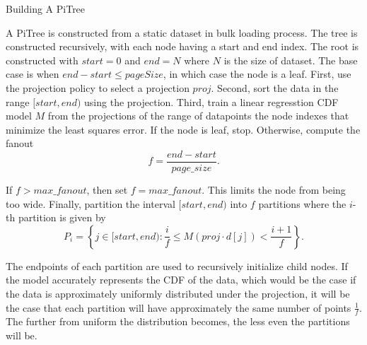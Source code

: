 \documentclass[sigconf,10pt]{acmart}
\begin{document}
\begin{algorithm}
  \caption{Building A PiTree}
\end{algorithm}

A PiTree is constructed from a static dataset in bulk loading process.
The tree is constructed recursively, with each node having a start and 
end index. The root is constructed with $start=0$ and $end=N$ where $N$
is the size of dataset. The base case is when $end - start \leq pageSize$,
in which case the node is a leaf.
First, use the projection policy to select a projection $proj$.
Second, sort the data in the range $[start, end)$ using the projection.
Third, train a linear regresstion CDF model $M$ from the projections of the range of datapoints
the node indexes that minimize the least squares error. If the node is leaf, stop. Otherwise,
compute the fanout
\[
  f = \frac{end - start}{page\_size}.
\]

If $f > max\_fanout$, then set $f = max\_fanout$. This limits
the node from being too wide. 
Finally, partition the interval $[start, end)$ into $f$ partitions
where the $i$-th partition is given by
\[
  P_i = \left\{j \in [start, end): \frac{i}{f} \leq M(proj \cdot d[j]) < \frac{i+1}{f} \right\}.
\]

The endpoints of each partition are used to recursively initialize child nodes.
If the model accurately represents the CDF of the data, which would be the case
if the data is approximately uniformly distributed under the projection,
it will be the case that each partition will have approximately the same number of
points $\frac{1}{f}$. The further from uniform the distribution becomes,
the less even the partitions will be.
\end{document}
